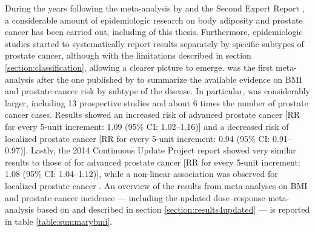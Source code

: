 During the years following the meta-analysis by \citet{macinnis_body_2006} and the Second Expert Report \citep{wcrf_food_2007}, a considerable amount of epidemiologic research on body adiposity and prostate cancer has been carried out, including  of this thesis. Furthermore, epidemiologic studies started to systematically report results separately by specific subtypes of prostate cancer, although with the limitations described in section \ref{section:classification}, allowing a clearer picture to emerge.  was the first meta-analysis after the one published by \citet{macinnis_body_2006} to summarize the available evidence on BMI and prostate cancer risk by subtype of the disease. In particular,  was considerably larger, including 13 prospective studies and about 6 times the number of prostate cancer cases. Results showed an increased risk of advanced prostate cancer [RR for every 5-unit increment: 1.09 (95\% CI: 1.02--1.16)] and a decreased risk of localized prostate cancer [RR for every 5-unit increment: 0.94 (95\% CI: 0.91--0.97)]. Lastly, the 2014 Continuous Update Project report showed very similar results to those of  for advanced prostate cancer [RR for every 5-unit increment: 1.08 (95\% CI: 1.04--1.12)], while a non-linear association was observed for localized prostate cancer \citep{wcrf_continuous_2014}. An overview of the results from meta-analyses on BMI and prostate cancer incidence --- including the updated dose--response meta-analysis based on  and described in section \ref{section:results4updated} --- is reported in table \ref{table:summarybmi}.


